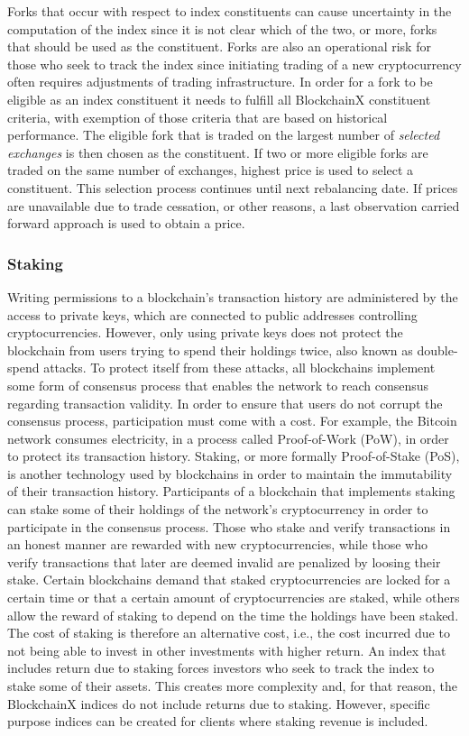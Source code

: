 \documentclass{article}
\begin{document}
Forks that occur with respect to index constituents can cause
uncertainty in the computation of the index since it is not clear which
of the two, or more, forks that should be used as the constituent. Forks
are also an operational risk for those who seek to track the index since
initiating trading of a new cryptocurrency often requires adjustments of
trading infrastructure. In order for a fork to be eligible as an index
constituent it needs to fulfill all BlockchainX constituent criteria,
with exemption of those criteria that are based on historical
performance. The eligible fork that is traded on the largest number of
\emph{selected exchanges} is then chosen as the constituent. If two or
more eligible forks are traded on the same number of exchanges, highest
price is used to select a constituent. This selection process continues
until next rebalancing date. If prices are unavailable due to trade
cessation, or other reasons, a last observation carried forward approach
is used to obtain a price.

\subsubsection{Staking}\label{staking}

Writing permissions to a blockchain's transaction history are
administered by the access to private keys, which are connected to
public addresses controlling cryptocurrencies. However, only using
private keys does not protect the blockchain from users trying to spend
their holdings twice, also known as double-spend attacks. To protect
itself from these attacks, all blockchains implement some form of
consensus process that enables the network to reach consensus regarding
transaction validity. In order to ensure that users do not corrupt the
consensus process, participation must come with a cost. For example, the
Bitcoin network consumes electricity, in a process called Proof-of-Work
(PoW), in order to protect its transaction history. Staking, or more
formally Proof-of-Stake (PoS), is another technology used by blockchains
in order to maintain the immutability of their transaction history.
Participants of a blockchain that implements staking can stake some of
their holdings of the network's cryptocurrency in order to participate
in the consensus process. Those who stake and verify transactions in an
honest manner are rewarded with new cryptocurrencies, while those who
verify transactions that later are deemed invalid are penalized by
loosing their stake. Certain blockchains demand that staked
cryptocurrencies are locked for a certain time or that a certain amount
of cryptocurrencies are staked, while others allow the reward of staking
to depend on the time the holdings have been staked. The cost of staking
is therefore an alternative cost, i.e., the cost incurred due to not
being able to invest in other investments with higher return. An index
that includes return due to staking forces investors who seek to track
the index to stake some of their assets. This creates more complexity
and, for that reason, the BlockchainX indices do not include returns due
to staking. However, specific purpose indices can be created for clients
where staking revenue is included.
\end{document}
